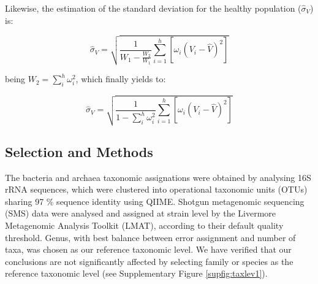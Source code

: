Likewise, the estimation of the standard deviation for the healthy population ($\widehat{\sigma}_V$) is:
\begin{linenomath}
$$\widehat{\sigma}_V = \sqrt{\frac{1}{W_1-\frac{W_2}{W_1}}\sum_{i=1}^h\left[\omega_i\left(V_i-\hat{V}\right)^2\right]}$$
\end{linenomath}
being $W_2=\sum_i^h \omega_i^2$, which finally yields to:
\begin{linenomath}
$$\widehat{\sigma}_V = \sqrt{\frac{1}{1-\sum_i^h \omega_i^2}\sum_{i=1}^h\left[\omega_i\left(V_i-\hat{V}\right)^2\right]}$$
\end{linenomath}

\subsection*{Selection and Methods}

The bacteria and archaea taxonomic assignations were obtained by analysing 16S rRNA sequences, which were clustered into operational taxonomic units (OTUs) sharing 97 \% sequence identity using QIIME\cite{QIIME}. Shotgun metagenomic sequencing (SMS) data\cite{kwashiorkor} were analysed and assigned at strain level by the Livermore Metagenomic Analysis Toolkit (LMAT)\cite{LMAT}, according to their default quality threshold. Genus, with best balance between error assignment and number of taxa, was chosen as our reference taxonomic level. We have verified that our conclusions are not significantly affected by selecting family or species as the reference taxonomic level (see Supplementary Figure \ref{supfig:taxlev1}).

